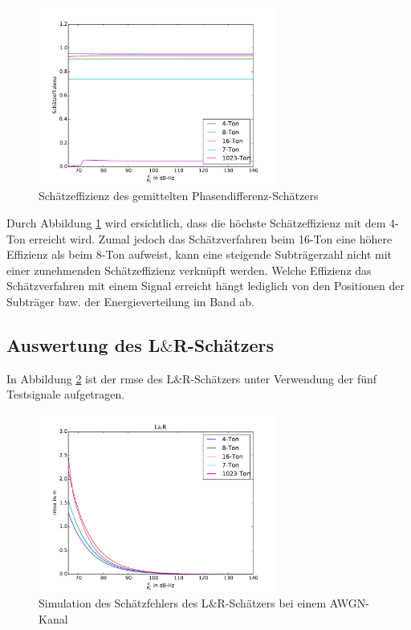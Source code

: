 \begin{figure}[htbp]
	\centering
	\includegraphics[width = 0.7\textwidth]{images/Schaetzeffizienz}
	\caption{Schätzeffizienz des gemittelten Phasendifferenz-Schätzers}
	\label{fig:Schätzeffizienz}
\end{figure} 

Durch Abbildung \ref{fig:Schätzeffizienz} wird ersichtlich, dass die höchste Schätzeffizienz mit dem 4-Ton erreicht wird. Zumal jedoch das Schätzverfahren beim 16-Ton eine höhere Effizienz als beim 8-Ton aufweist, kann eine steigende Subträgerzahl nicht mit einer zunehmenden Schätzeffizienz verknüpft werden. Welche Effizienz das Schätzverfahren mit einem Signal erreicht hängt lediglich von den Positionen der Subträger bzw. der Energieverteilung im Band ab.  

\subsection{Auswertung des L\texorpdfstring{$\&$}{TEXT}R-Schätzers}
\label{chap5.1.2:LundR Auswertung}
In Abbildung \ref{fig:LundR_varianz} ist der \gls{rmse} des L$\&$R-Schätzers unter Verwendung der fünf Testsignale aufgetragen. 

\begin{figure}[htbp]
	\centering
	\includegraphics[width = 0.7\textwidth]{images/LundR_varianz}
	\caption{Simulation des Schätzfehlers des L$\&$R-Schätzers bei einem \gls{AWGN}-Kanal}
	\label{fig:LundR_varianz}
\end{figure}

